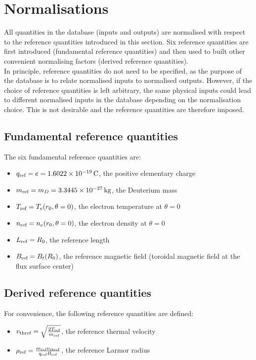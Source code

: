 \documentclass[fleqn]{report}
\begin{document}
\section{Normalisations}
All quantities in the database (inputs and outputs) are normalised with respect to the reference quantities introduced in this section. Six reference quantities are first introduced (fundamental reference quantities) and then used to built other convenient normalising factors (derived reference quantities).\\
In principle, reference quantities do not need to be specified, as the purpose of the database is to relate normalised inputs to normalised outputs. 
However, if the choice of reference quantities is left arbitrary, the same physical inputs could lead to different normalised inputs in the database depending on the normalisation choice. This is not desirable and the reference quantities are therefore imposed. 

\subsection{Fundamental reference quantities}
The six fundamental reference quantities are:
\begin{itemize}
\item $q_{\textrm{ref}}=e=1.6022\times10^{-19}\,\textrm{C}$, the positive elementary charge
\item $m_{\textrm{ref}}=m_D=3.3445\times10^{-27}\,\textrm{kg}$, the Deuterium mass
\item $T_{\textrm{ref}}=T_e(r_0,\theta=0)$, the electron temperature at $\theta=0$
\item $n_{\textrm{ref}}=n_e(r_0,\theta=0)$, the electron density at $\theta=0$
\item $L_{\textrm{ref}}=R_0$, the reference length
\item $B_{\textrm{ref}}=B_t(R_0)$, the reference magnetic field (toroidal magnetic field at the flux surface center)
\end{itemize}

\subsection{Derived reference quantities}
For convenience, the following reference quantities are defined:
\begin{itemize}
\item $v_\textrm{thref}=\sqrt{\frac{2T_{\textrm{ref}}}{m_{\textrm{ref}}}}$, the reference thermal velocity
\item $\rho_{\textrm{ref}} = \frac{m_{\textrm{ref}} v_\textrm{thref}}{q_{\textrm{ref}} B_{\textrm{ref}}}$, the reference Larmor radius
\end{itemize}
\end{document}
